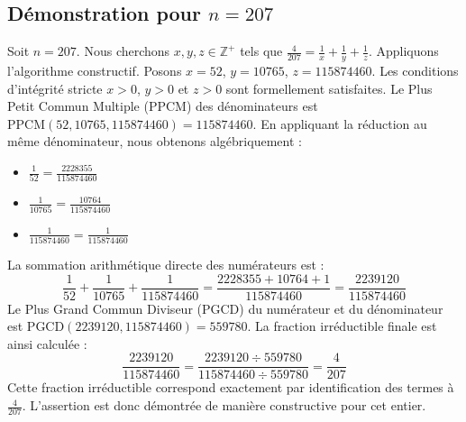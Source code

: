 \documentclass[11pt,a4paper]{article}
\begin{document}
\subsection{Démonstration pour $n = 207$}
Soit $n = 207$. Nous cherchons $x, y, z \in \mathbb{Z}^{+}$ tels que $\frac{4}{207} = \frac{1}{x} + \frac{1}{y} + \frac{1}{z}$.
Appliquons l'algorithme constructif. Posons $x = 52$, $y = 10765$, $z = 115874460$.
Les conditions d'intégrité stricte $x > 0$, $y > 0$ et $z > 0$ sont formellement satisfaites.
Le Plus Petit Commun Multiple (PPCM) des dénominateurs est $\text{PPCM}(52, 10765, 115874460) = 115874460$.
En appliquant la réduction au même dénominateur, nous obtenons algébriquement :
\begin{itemize}
    \item $\frac{1}{52} = \frac{2228355}{115874460}$
    \item $\frac{1}{10765} = \frac{10764}{115874460}$
    \item $\frac{1}{115874460} = \frac{1}{115874460}$
\end{itemize}
La sommation arithmétique directe des numérateurs est :
$$ \frac{1}{52} + \frac{1}{10765} + \frac{1}{115874460} = \frac{2228355 + 10764 + 1}{115874460} = \frac{2239120}{115874460} $$
Le Plus Grand Commun Diviseur (PGCD) du numérateur et du dénominateur est $\text{PGCD}(2239120, 115874460) = 559780$.
La fraction irréductible finale est ainsi calculée :
$$ \frac{2239120}{115874460} = \frac{2239120 \div 559780}{115874460 \div 559780} = \frac{4}{207} $$
Cette fraction irréductible correspond exactement par identification des termes à $\frac{4}{207}$. L'assertion est donc démontrée de manière constructive pour cet entier.
\end{document}
